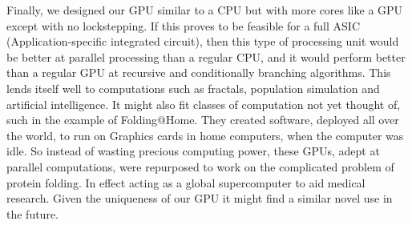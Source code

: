 		Finally, we designed our GPU similar to a CPU but with more	cores
		like a GPU except with no lockstepping. If this proves to be feasible
		for a full ASIC (Application-specific integrated circuit), then this
		type of processing unit would be better at parallel processing than a
		regular CPU, and it would perform better than a regular GPU at
		recursive and conditionally branching algorithms. This lends itself
		well to computations such as fractals, population simulation and
		artificial intelligence. It might also fit classes of computation not
		yet thought of, such in the example of Folding@Home\cite{Beberg2009}.
		They created software, deployed all over the world, to run on
		Graphics cards in home computers, when the computer was idle. So
		instead of wasting precious computing power, these GPUs, adept at
		parallel computations, were repurposed to work on the complicated
		problem of protein folding. In effect acting as a global
		supercomputer to aid medical research. Given the uniqueness of our
		GPU it might find a similar novel use in the future.
